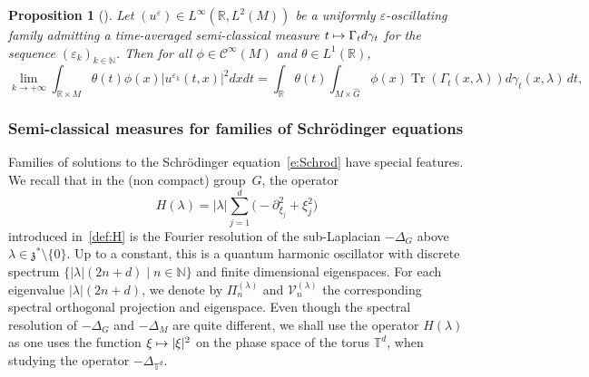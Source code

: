 \documentclass[10pt]{amsart}
\let\mathcal\mathscr
\newcommand\mto{\mathchoice{\longmapsto}{\mapsto}{\mapsto}{\mapsto}}
\let\sep\mid
\DeclareMathOperator{\Tr}{Tr}
\theoremstyle{plain}
\newtheorem{proposition}[theorem]{Proposition}
\theoremstyle{definition}
\let\eps\varepsilon
\def\R{{\mathbb R}}
\def\N{{\mathbb N}}
\def\T{{\mathbb T}}
\begin{document}
\begin{proposition}[{\cite[Prop.\,5.3]{FF}}]
\label{prop:eops}
Let $(u^\eps)\!\in\!L^\infty(\R, L^2(M))$ be a uniformly $\eps$\nobreakdash-oscil\-lating family admitting a time-averaged semi-classical measure $t\mto \Gamma_t d\gamma_t$ for the sequence $(\eps_k)_{k\in \N}$. Then
for all
$\phi\in{\mathcal C}^\infty (M)$ and $\theta\in L^1(\R)$,
\[
\lim_{k\to +\infty} \int_{\R\times M} \theta(t) \phi(x) |u^{\eps_k}(t,x)|^2 dxdt
=\int_{\R} \theta(t)
\int_{M\times \widehat G}
\phi(x) \Tr \left(\Gamma_t(x,\lambda) \right) d\gamma_t(x,\lambda) \, dt,
\]
\end{proposition}

\subsubsection{Semi-classical measures for families of Schrödinger equations}

Families of solu\-tions to the Schrödinger equation~\eqref{e:Schrod} have special features. We recall that in the (non compact) group~$G$, the operator
\[
H(\lambda)=|\lambda| \sum_{j=1}^{d} \bigl(-\partial_{\xi_j}^2+\xi_j^2\bigr)
\]
introduced in~\eqref{def:H} is the Fourier resolution of the sub-Laplacian $-\Delta_G$ above $\lambda\in \mathfrak z^*\setminus \{0\}$.
Up to a constant, this is a quantum harmonic oscillator with
discrete spectrum $\{|\lambda|(2n+d)\sep n\in \N\}$
and finite dimensional eigenspaces.
For each eigenvalue \hbox{$|\lambda|(2n+d)$}, we denote by
$
\Pi_n^{(\lambda)}$ and
$\mathcal V^{(\lambda)}_n
$
the corresponding spectral orthogonal projection and eigenspace.
Even though the spectral resolution of $-\Delta_G$ and $-\Delta_M$ are quite different, we shall use the operator $H(\lambda)$ as one uses the function $\xi\mto |\xi|^2$ on the phase space of the torus $\T^d$, when studying the operator $-\Delta_{\T^d}$.
\end{document}
